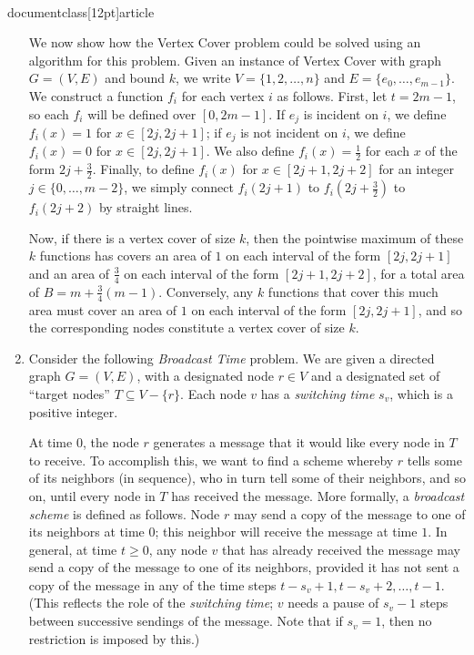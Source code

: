 \\documentclass[12pt]{article}
\begin{document}
\begin{enumerate}
{We now show how the Vertex Cover problem could be 
solved using an algorithm for this problem.
Given an instance of Vertex Cover with graph $G = (V,E)$
and bound $k$, we write $V = \{1, 2, \ldots, n\}$ and
$E = \{e_0, \ldots, e_{m-1}\}$.
We construct a function $f_i$ for each vertex $i$ as follows.
First, let $t = 2m-1$, so each $f_i$ will be defined over $[0,2m-1]$.
If $e_j$ is incident on $i$, we define 
$f_i(x) = 1$ for $x \in [2j, 2j+1]$;
if $e_j$ is not incident on $i$, we define 
$f_i(x) = 0$ for $x \in [2j, 2j+1]$.
We also define $f_i(x) = \frac12$ for each $x$
of the form $2j + \frac32$.
Finally, to define $f_i(x)$ for $x \in [2j + 1, 2j + 2]$
for an integer $j \in \{0, \ldots, m-2\}$,
we simply connect $f_i(2j+1)$ to 
$f_i(2j + \frac32)$ to $f_i(2j + 2)$ by straight lines.

Now, if there is a vertex cover of size $k$, then
the pointwise maximum of these $k$ functions
has covers an area of $1$ on each interval of the form
$[2j, 2j + 1]$ and an area of $\frac34$ on each 
interval of the form $[2j + 1, 2j + 2]$,
for a total area of $B = m + \frac34(m-1)$.
Conversely, any $k$ functions that cover this much area
must cover an area of $1$ on each interval of the form
$[2j, 2j + 1]$, and so the corresponding nodes constitute a vertex
cover of size $k$.

}


\item 

Consider the following {\em Broadcast Time} problem.
We are given a directed graph $G = (V,E)$, with a designated node $r \in V$
and a designated set of ``target nodes'' $T \subseteq V - \{r\}$.
Each node $v$ has a {\em switching time} $s_v$, which is a positive integer.

At time $0$, the node $r$ generates a message that it would
like every node in $T$ to receive.
To accomplish this, we want to find a scheme whereby
$r$ tells some of its neighbors (in sequence), who in turn
tell some of their neighbors, and so on, until every node in $T$
has received the message.
More formally, a {\em broadcast scheme} is defined as follows.
Node $r$ may send a copy of the message to one of its
neighbors at time $0$; this neighbor will receive the message at time $1$.
In general, at time $t \geq 0$,
any node $v$ that has already received the message
may send a copy of the message to one of its neighbors, provided it has
not sent a copy of the message in any of the time steps
$t - s_v + 1, t - s_v + 2, \ldots, t - 1$.
(This reflects the role of the {\em switching time};
$v$ needs a pause of $s_v - 1$ steps between successive
sendings of the message.
Note that if $s_v = 1$, then no restriction is imposed by this.)


\end{enumerate}
\end{document}
